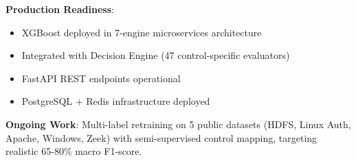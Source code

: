 \documentclass[11pt,conference]{IEEEtran}
\begin{document}
\textbf{Production Readiness}:
\begin{itemize}
    \item XGBoost deployed in 7-engine microservices architecture
    \item Integrated with Decision Engine (47 control-specific evaluators)
    \item FastAPI REST endpoints operational
    \item PostgreSQL + Redis infrastructure deployed
\end{itemize}

\textbf{Ongoing Work}: Multi-label retraining on 5 public datasets (HDFS, Linux Auth, Apache, Windows, Zeek) with semi-supervised control mapping, targeting realistic 65-80\% macro F1-score.
\end{document}
